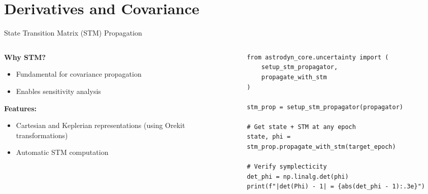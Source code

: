 \documentclass[aspectratio=169,12pt]{beamer}
\begin{document}
\section{Derivatives and Covariance}

\begin{frame}[fragile]{State Transition Matrix (STM) Propagation}
    \begin{columns}
        \begin{column}{0.5\textwidth}
            \textbf{Why STM?}
            \begin{itemize}
                \item Fundamental for covariance propagation
                \item Enables sensitivity analysis
            \end{itemize}
            \vspace{0.3cm}
            \textbf{Features:}
            \begin{itemize}
                \item Cartesian and Keplerian representations (using Orekit transformations)
                \item Automatic STM computation
            \end{itemize}
        \end{column}
        \begin{column}{0.5\textwidth}
            \begin{verbatim}
from astrodyn_core.uncertainty import (
    setup_stm_propagator,
    propagate_with_stm
)

stm_prop = setup_stm_propagator(propagator)

# Get state + STM at any epoch
state, phi = stm_prop.propagate_with_stm(target_epoch)

# Verify symplecticity
det_phi = np.linalg.det(phi)
print(f"|det(Phi) - 1| = {abs(det_phi - 1):.3e}")
            \end{verbatim}
        \end{column}
    \end{columns}
\end{frame}
\end{document}
